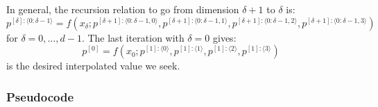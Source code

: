 \documentclass[11pt]{article}
\begin{document}
In general, the recursion relation to go from dimension $\delta+1$ to $\delta$ is:
\begin{equation}
p^{[\delta]: \langle 0:\delta-1 \rangle} = f \left ( 
x_{\delta} ; 
p^{[\delta+1]: \langle 0:\delta-1,0 \rangle},
p^{[\delta+1]: \langle 0:\delta-1,1 \rangle},
p^{[\delta+1]: \langle 0:\delta-1,2 \rangle},
p^{[\delta+1]: \langle 0:\delta-1,3 \rangle}
\right ) 
\label{eq:rec}
\end{equation}
for $\delta = 0,\dots,d-1$. The last iteration with $\delta = 0$ gives:
\begin{equation}
p^{[0]} = f \left ( 
x_0 ; 
p^{[1]: \langle 0 \rangle},
p^{[1]: \langle 1 \rangle},
p^{[1]: \langle 2 \rangle},
p^{[1]: \langle 3 \rangle}
\right )
\label{eq:soln}
\end{equation}
is the desired interpolated value we seek.


\subsubsection{Pseudocode}

\end{document}
